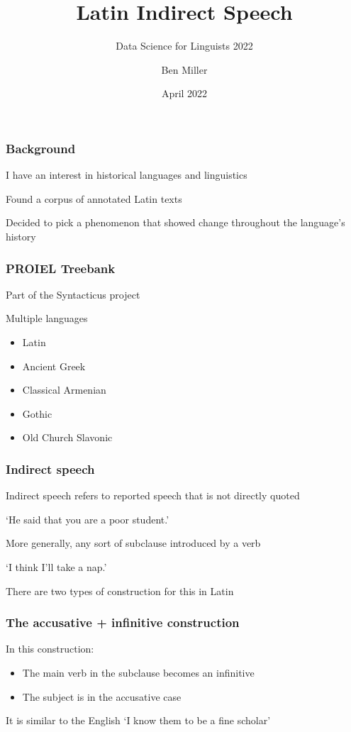 \documentclass{beamer}
\title{Latin Indirect Speech}
\subtitle{Data Science for Linguists 2022}
\author{Ben Miller}
\date{April 2022}
\begin{document}
\maketitle

\begin{frame}
\frametitle{Background}
I have an interest in historical languages and linguistics

Found a corpus of annotated Latin texts

Decided to pick a phenomenon that showed change throughout the language's history

\end{frame}

\begin{frame}
\frametitle{PROIEL Treebank}
Part of the Syntacticus project

Multiple languages
\begin{itemize}
    \item Latin
    \item Ancient Greek
    \item Classical Armenian
    \item Gothic
    \item Old Church Slavonic
\end{itemize}
\end{frame}

\begin{frame}
\frametitle{Indirect speech}
Indirect speech refers to reported speech that is not directly quoted

`He said that you are a poor student.'

More generally, any sort of subclause introduced by a verb

`I think I'll take a nap.'

There are two types of construction for this in Latin

\end{frame}

\begin{frame}
\frametitle{The accusative + infinitive construction}
In this construction:
\begin{itemize}
    \item The main verb in the subclause becomes an infinitive
    \item The subject is in the accusative case
\end{itemize}

It is similar to the English `I know them to be a fine scholar'

\end{frame}
\end{document}
